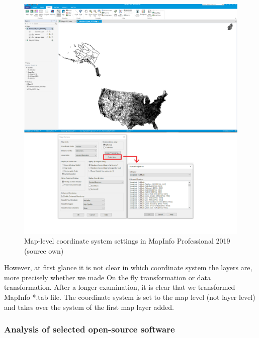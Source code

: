 \documentclass[a4paper,10pt,twoside]{article}
\begin{document}
\vspace{0.3cm}
\begin{figure}[hbt!] 
\begin{center}
\includegraphics[width=15cm]{../pictures/map_info.PNG} 
\caption[Map-level coordinate system settings in MapInfo Professional 2019 (source own)]{Map-level coordinate system settings in MapInfo Professional 2019 (source own)}
\label{fig:map_info_startup_projection}
\end{center}
\end{figure}

\noindent However, at first glance it is not clear in which coordinate system the layers are, more precisely whether we made On the fly transformation or data transformation. After a longer examination, it is clear that we transformed MapInfo *.tab file. The coordinate system is set to the map level (not layer level) and takes over the system of the first map layer added. 

\newpage
\vspace*{-1cm}
\subsubsection{Analysis of selected open-source software}
\end{document}
